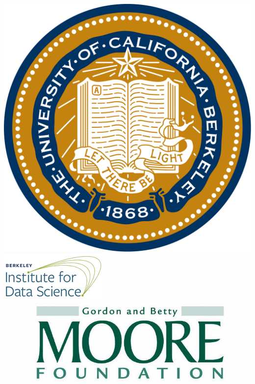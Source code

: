 \documentclass[11pt,xcolor=dvipsnames]{beamer}
\begin{document}
\begin{frame}
\begin{columns}
\begin{column}{0.08\linewidth}
\vspace{15pt}
\includegraphics[width=0.9\linewidth]{images/uc_berkeley.png} \\
\vspace{15pt}
\includegraphics[width=0.9\linewidth]{images/bids.png} \\
\vspace{15pt}
\includegraphics[width=0.9\linewidth]{images/moore_foundation.jpg} \\
\vspace{15pt}

\end{column}
\end{columns}
\end{frame}
\end{document}
